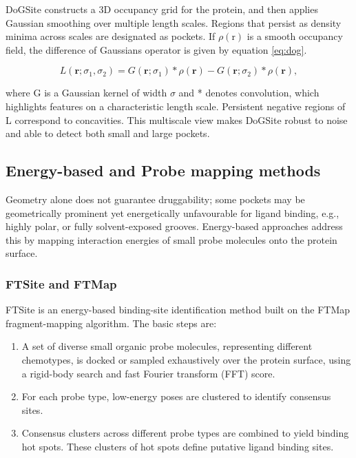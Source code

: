 \documentclass[12pt]{article}
\begin{document}
DoGSite\cite{CH5_Volkamer2010,CH5_volkamer2012dogsitescorer} constructs a 3D occupancy grid for the protein, and then applies Gaussian smoothing over multiple length scales. Regions that persist as density minima across scales are designated as pockets. If $\rho(\textrm{r})$ is a smooth occupancy field, the difference of Gaussians operator is given by equation \ref{eq:dog}.

\begin{equation}
L(\mathbf{r}; \sigma_1, \sigma_2) = G(\mathbf{r}; \sigma_1) * \rho(\mathbf{r}) - G(\mathbf{r}; \sigma_2) * \rho(\mathbf{r}),
\label{eq:dog}
\end{equation}

where G is a Gaussian kernel of width $\sigma$ and * denotes convolution, which highlights features on a characteristic length scale. Persistent negative regions of L correspond to concavities. This multiscale view makes DoGSite robust to noise and able to detect both small and large pockets.\cite{CH5_Volkamer2010,CH5_zhao2020exploring}

\subsection{Energy-based and Probe mapping methods}

Geometry alone does not guarantee druggability; some pockets may be geometrically prominent yet energetically unfavourable for ligand binding, e.g., highly polar, or fully solvent-exposed grooves. Energy-based approaches address this by mapping interaction energies of small probe molecules onto the protein surface.

\subsubsection{FTSite and FTMap}

FTSite\cite{CH5_Ngan2012} is an energy-based binding-site identification method built on the FTMap fragment-mapping algorithm\cite{CH5_ngan2012ftmap}. The basic steps are:
\begin{enumerate}
    \item A set of diverse small organic probe molecules, representing different chemotypes, is docked or sampled exhaustively over the protein surface, using a rigid-body search and fast Fourier transform (FFT) score.
    \item For each probe type, low-energy poses are clustered to identify consensus sites.
    \item Consensus clusters across different probe types are combined to yield binding hot spots. These clusters of hot spots define putative ligand binding sites.
\end{enumerate}
\end{document}
